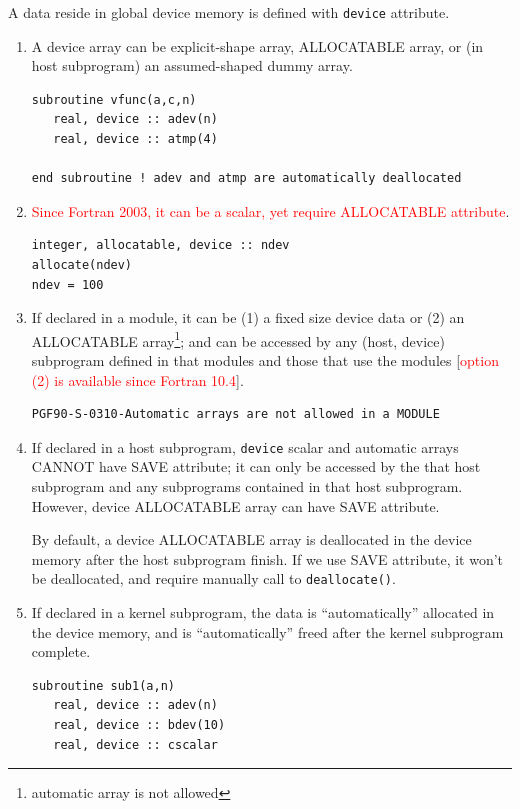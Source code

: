 A data reside in global device memory is defined with
\verb.device. attribute.
\begin{enumerate}

\item A device array can be explicit-shape array, ALLOCATABLE array,
  or (in host subprogram) an assumed-shaped dummy array.

\begin{lstlisting}
subroutine vfunc(a,c,n) 
   real, device :: adev(n)
   real, device :: atmp(4)

end subroutine ! adev and atmp are automatically deallocated
\end{lstlisting}

\item
  \textcolor{red}{Since Fortran 2003, it can be a scalar, yet require
    ALLOCATABLE attribute}.
\begin{lstlisting}
integer, allocatable, device :: ndev
allocate(ndev)
ndev = 100
\end{lstlisting}

\item If declared in a module, it can be (1) a fixed size device data
  or (2) an ALLOCATABLE
  array\footnote{automatic array is not allowed}; and can be accessed
  by any (host, device) subprogram defined in that modules and those
  that use the modules
  [\textcolor{red}{option (2) is available since Fortran 10.4}].
\begin{verbatim}
PGF90-S-0310-Automatic arrays are not allowed in a MODULE
\end{verbatim}

\item If declared in a host subprogram, \verb!device! scalar and
  automatic arrays CANNOT have SAVE attribute; it can only be accessed
  by the that host subprogram and any subprograms contained in that
  host subprogram. However, device ALLOCATABLE array can have SAVE
  attribute.

  By default, a device ALLOCATABLE array is deallocated in the device
  memory after the host subprogram finish. If we use SAVE attribute,
  it won't be deallocated, and require manually call to
  \verb!deallocate()!.

\item If declared in a kernel subprogram, the data is
  ``automatically'' allocated in the device memory, and
  is ``automatically'' freed after the kernel subprogram complete.
\begin{lstlisting}
subroutine sub1(a,n)
   real, device :: adev(n)
   real, device :: bdev(10)
   real, device :: cscalar
\end{lstlisting}


\end{enumerate}

